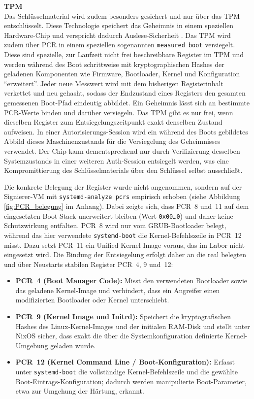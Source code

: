 \textbf{TPM} \\
Das Schlüsselmaterial wird zudem besonders gesichert und nur über das \ac{TPM} entschlüsselt. Diese Technologie speichert das Geheimnis in einem speziellen Hardware-Chip und verspricht dadurch Auslese-Sicherheit \cite{TPM}.
Das \ac{TPM} wird zudem über \ac{PCR} in einem speziellen sogenannten \texttt{measured boot} versiegelt. Diese sind spezielle, zur Laufzeit nicht frei beschreibbare Register im \ac{TPM} und werden während des Boot schrittweise mit kryptographischen Hashes der geladenen Komponenten wie Firmware, Bootloader, Kernel und Konfiguration \enquote{erweitert}. Jeder neue Messwert wird mit dem bisherigen Registerinhalt verkettet und neu gehasht, sodass der Endzustand eines Registers den gesamten gemessenen Boot-Pfad eindeutig abbildet. Ein Geheimnis lässt sich an bestimmte \ac{PCR}-Werte binden und darüber versiegeln. Das \ac{TPM} gibt es nur frei, wenn dieselben Register zum Entsiegelungszeitpunkt exakt denselben Zustand aufweisen.
In einer Autorisierungs-Session wird ein während des Boots gebildetes Abbild dieses Maschinenzustands für die Versiegelung des Geheimnisses verwendet. Der Chip kann dementsprechend nur durch Verifizierung desselben Systemzustands in einer weiteren Auth-Session entsiegelt werden, was eine Kompromittierung des Schlüsselmaterials über den Schlüssel selbst ausschließt.

Die konkrete Belegung der Register wurde nicht angenommen, sondern auf der Signierer-\ac{VM} mit \texttt{systemd-analyze pcrs} empirisch erhoben (siehe Abbildung \ref{fig:PCR_belegung} im Anhang). Dabei zeigte sich, dass \ac{PCR}~8 und~11 auf dem eingesetzten Boot-Stack unerweitert bleiben (Wert \texttt{0x00\dots{}0}) und daher keine Schutzwirkung entfalten. \ac{PCR}~8 wird nur vom GRUB-Bootloader belegt, während das hier verwendete \texttt{systemd-boot} die Kernel-Befehlszeile in \ac{PCR}~12 misst. Dazu setzt \ac{PCR}~11 ein Unified Kernel Image voraus, das im Labor nicht eingesetzt wird. Die Bindung der Entsiegelung erfolgt daher an die real belegten und über Neustarts stabilen Register \ac{PCR}~4, 9 und~12:
\begin{itemize}
    \item \textbf{\ac{PCR}~4 (Boot Manager Code):} Misst den verwendeten Bootloader sowie das geladene Kernel-Image und verhindert, dass ein Angreifer einen modifizierten Bootloader oder Kernel unterschiebt.
    \item \textbf{\ac{PCR}~9 (Kernel Image und Initrd):} Speichert die kryptografischen Hashes des Linux-Kernel-Images und der initialen RAM-Disk und stellt unter NixOS sicher, dass exakt die über die Systemkonfiguration definierte Kernel-Umgebung geladen wurde.
    \item \textbf{\ac{PCR}~12 (Kernel Command Line / Boot-Konfiguration):} Erfasst unter \texttt{systemd-boot} die vollständige Kernel-Befehlszeile und die gewählte Boot-Eintrags-Konfiguration; dadurch werden manipulierte Boot-Parameter, etwa zur Umgehung der Härtung, erkannt.
\end{itemize}

